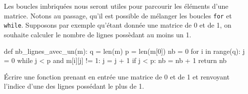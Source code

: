 \documentclass{magnoliaold}
\begin{document}
Les boucles imbriquées nous seront utiles pour parcourir les éléments d'une matrice. Notons au
passage, qu'il est possible de mélanger les boucles \verb!for! et \verb!while!.
Supposons par exemple qu'étant donnée une matrice de 0 et de 1, on souhaite calculer le
nombre de lignes possèdant au moins un 1.

\begin{pythoncodeline}
def nb_lignes_avec_un(m):
    q = len(m)
    p = len(m[0])
    nb = 0
    for i in range(q):
        j = 0
        while j < p and m[i][j] != 1:
            j = j + 1
        if j < p:
            nb = nb + 1
    return nb
\end{pythoncodeline}

\begin{exoUnique}
\exo Écrire une fonction prenant en entrée une matrice de 0 et de 1
  et renvoyant l'indice d'une des lignes possédant le plus de 1.
\end{exoUnique}




                
 
 
 
                









\end{document}
